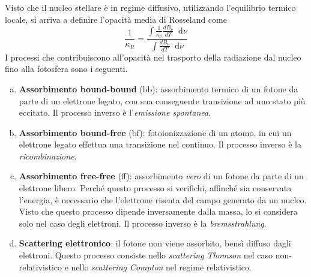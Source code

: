 \documentclass[11pt, a4paper]{scrartcl}
\theoremstyle{style}
\theoremstyle{style1}
\newcommand{\dd}{\mathop{}\!\mathrm{d}}
\numberwithin{equation}{subsection}
\begin{document}
Visto che il nucleo stellare \`e in regime diffusivo, utilizzando l'equilibrio termico locale, si arriva a definire l'opacit\`a media di Rosseland come 
\[
\frac{1}{\kappa _R}= \frac{\displaystyle \int \frac{1}{\kappa _\nu }\frac{d B_\nu }{d T} \dd \nu }{\displaystyle \int \frac{d B_\nu }{d T} \dd \nu } 
\] 
I processi che contribuiscono all'opacit\`a nel trasporto della radiazione dal nucleo fino alla fotosfera sono i seguenti.
\begin{enumerate}[(a).]
	\item \textbf{Assorbimento bound-bound} (bb): assorbimento termico di un fotone da parte di un elettrone legato, con sua conseguente transizione ad uno stato pi\`u eccitato.
		Il processo inverso \`e l'\textit{emissione spontanea}.
	\item \textbf{Assorbimento bound-free} (bf): fotoionizzazione di un atomo, in cui un elettrone legato effettua una transizione nel continuo.
		Il processo inverso \`e la \textit{ricombinazione}.
	\item \textbf{Assorbimento free-free} (ff): assorbimento \textit{vero} di un fotone da parte di un elettrone libero. Perch\'e questo processo si verifichi, affinch\'e sia conservata l'energia, \`e necessario che l'elettrone risenta del campo generato da un nucleo.
		Visto che questo processo dipende inversamente dalla massa, lo si considera solo nel caso degli elettroni.
		Il processo inverso \`e la \textit{bremsstrahlung}.
	\item \textbf{Scattering elettronico}: il fotone non viene assorbito, bens\`i diffuso dagli elettroni. 
		Questo processo consiste nello \textit{scattering Thomson} nel caso non-relativistico e nello \textit{scattering Compton} nel regime relativistico.
\end{enumerate}
\end{document}
